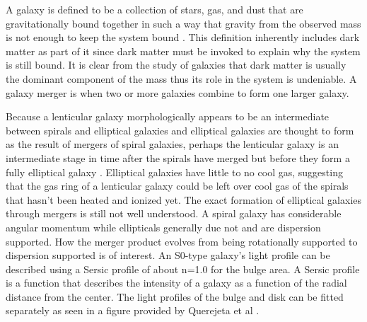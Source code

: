 \documentclass[fleqn,usenatbib]{mnras}
\begin{document}
A galaxy is defined to be a collection of stars, gas, and dust that are gravitationally bound together in such a way that gravity from the observed mass is not enough to keep the system bound \citep{Willman_2012}. This definition inherently includes dark matter as part of it since dark matter must be invoked to explain why the system is still bound. It is clear from the study of galaxies that dark matter is usually the dominant component of the mass thus its role in the system is undeniable. A galaxy merger is when two or more galaxies combine to form one larger galaxy.

Because a lenticular galaxy morphologically appears to be an intermediate between spirals and elliptical galaxies and elliptical galaxies are thought to form as the result of mergers of spiral galaxies, perhaps the lenticular galaxy is an intermediate stage in time after the spirals have merged but before they form a fully elliptical galaxy \citep{Cox_2006}. Elliptical galaxies have little to no cool gas, suggesting that the gas ring of a lenticular galaxy could be left over cool gas of the spirals that hasn’t been heated and ionized yet. The exact formation of elliptical galaxies through mergers is still not well understood. A spiral galaxy has considerable angular momentum while ellipticals generally due not and are dispersion supported\citep{Cox_2006}. How the merger product evolves from being rotationally supported to dispersion supported is of interest.
 An S0-type galaxy's light profile can be described using a Sersic profile of about n=1.0 for the bulge area\citep{Querejeta_2015}. A Sersic profile is a function that describes the intensity of a galaxy as a function of the radial distance from the center. The light profiles of the bulge and disk can be fitted separately as seen in a figure provided by Querejeta et al \citep{Querejeta_2015}.
\end{document}
